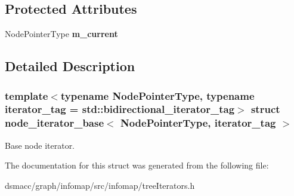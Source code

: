 \subsection*{Protected Attributes}
\begin{DoxyCompactItemize}
\item 
\mbox{\label{structnode__iterator__base_a514f072d8e90db32e38bddf1a2e1472e}} 
Node\+Pointer\+Type {\bfseries m\+\_\+current}
\end{DoxyCompactItemize}


\subsection{Detailed Description}
\subsubsection*{template$<$typename Node\+Pointer\+Type, typename iterator\+\_\+tag = std\+::bidirectional\+\_\+iterator\+\_\+tag$>$\newline
struct node\+\_\+iterator\+\_\+base$<$ Node\+Pointer\+Type, iterator\+\_\+tag $>$}

Base node iterator. 

The documentation for this struct was generated from the following file\+:\begin{DoxyCompactItemize}
\item 
dsmacc/graph/infomap/src/infomap/tree\+Iterators.\+h\end{DoxyCompactItemize}
